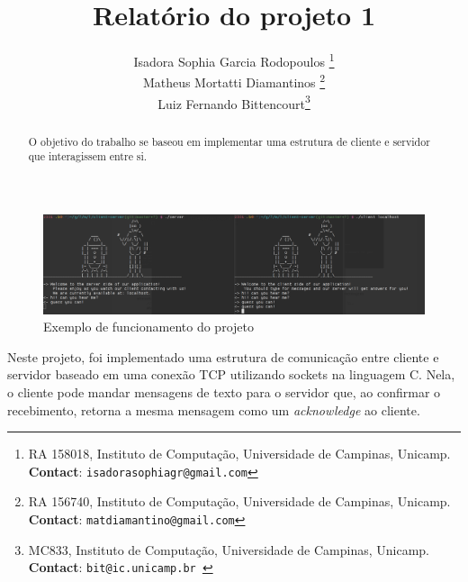 \documentclass[10pt,twocolumn,letterpaper]{article}
\begin{document}
\title{Relatório do projeto 1}
\author{Isadora Sophia Garcia Rodopoulos \thanks{RA 158018, Instituto de Computação, Universidade de Campinas, Unicamp. \textbf{Contact}: \tt\small{isadorasophiagr@gmail.com}} \\
Matheus Mortatti Diamantinos \thanks{RA 156740, Instituto de Computação, Universidade de Campinas, Unicamp. \textbf{Contact}: \tt\small{matdiamantino@gmail.com}}\\
Luiz Fernando Bittencourt\thanks{MC833, Instituto de Computação, Universidade de Campinas, Unicamp. \textbf{Contact}: \tt\small{bit@ic.unicamp.br }}\\
}

\maketitle
\begin{abstract}
O objetivo do trabalho se baseou em implementar uma estrutura de cliente e servidor que interagissem entre si.
\end{abstract}

\begin{figure}
\begin{center}
    \includegraphics[width=1\textwidth]{img/sample.png}
    \caption{Exemplo de funcionamento do projeto}   
\end{center} 
\end{figure}

Neste projeto, foi implementado uma estrutura de comunicação entre cliente e servidor baseado em uma conexão TCP utilizando sockets na linguagem C. Nela, o cliente pode mandar mensagens de texto para o servidor que, ao confirmar o recebimento, retorna a mesma mensagem como um \textit{acknowledge} ao cliente.

\end{document}
